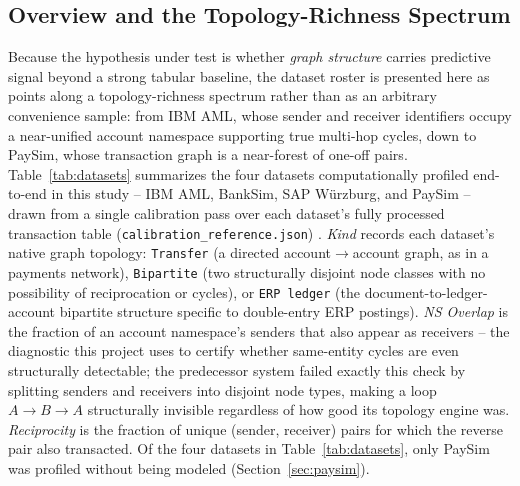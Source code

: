 \subsection{Overview and the Topology-Richness Spectrum}

Because the hypothesis under test is whether \emph{graph structure} carries
predictive signal beyond a strong tabular baseline, the dataset roster is
presented here as points along a topology-richness spectrum rather than as
an arbitrary convenience sample: from IBM AML, whose sender and receiver
identifiers occupy a near-unified account namespace supporting true
multi-hop cycles, down to PaySim, whose transaction graph is a near-forest
of one-off pairs. Table~\ref{tab:datasets} summarizes the four datasets
computationally profiled end-to-end in this study -- IBM AML, BankSim, SAP
W\"urzburg, and PaySim -- drawn from a single calibration pass over each
dataset's fully processed transaction table
(\texttt{calibration\_reference.json})
\cite{altman2023realistic,lopezrojas2014banksim,lopezrojas2016paysim}.
\emph{Kind} records each dataset's native graph topology: \texttt{Transfer}
(a directed account$\to$account graph, as in a payments network),
\texttt{Bipartite} (two structurally disjoint node classes with no
possibility of reciprocation or cycles), or \texttt{ERP ledger} (the
document-to-ledger-account bipartite structure specific to double-entry
ERP postings). \emph{NS Overlap} is the fraction of an account
namespace's senders that also appear as receivers -- the diagnostic this
project uses to certify whether same-entity cycles are even structurally
detectable; the predecessor system failed exactly this check by splitting
senders and receivers into disjoint node types, making a loop
$A\to B\to A$ structurally invisible regardless of how good its topology
engine was. \emph{Reciprocity} is the fraction of unique
(sender, receiver) pairs for which the reverse pair also transacted. Of
the four datasets in Table~\ref{tab:datasets}, only PaySim was profiled
without being modeled (Section~\ref{sec:paysim}).

